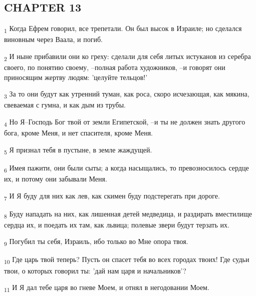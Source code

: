 \subsection{CHAPTER 13}
\begin{tcolorbox}
\textsubscript{1} Когда Ефрем говорил, все трепетали. Он был высок в Израиле; но сделался виновным через Ваала, и погиб.
\end{tcolorbox}
\begin{tcolorbox}
\textsubscript{2} И ныне прибавили они ко греху: сделали для себя литых истуканов из серебра своего, по понятию своему, --полная работа художников, --и говорят они приносящим жертву людям: 'целуйте тельцов!'
\end{tcolorbox}
\begin{tcolorbox}
\textsubscript{3} За то они будут как утренний туман, как роса, скоро исчезающая, как мякина, свеваемая с гумна, и как дым из трубы.
\end{tcolorbox}
\begin{tcolorbox}
\textsubscript{4} Но Я--Господь Бог твой от земли Египетской, --и ты не должен знать другого бога, кроме Меня, и нет спасителя, кроме Меня.
\end{tcolorbox}
\begin{tcolorbox}
\textsubscript{5} Я признал тебя в пустыне, в земле жаждущей.
\end{tcolorbox}
\begin{tcolorbox}
\textsubscript{6} Имея пажити, они были сыты; а когда насыщались, то превозносилось сердце их, и потому они забывали Меня.
\end{tcolorbox}
\begin{tcolorbox}
\textsubscript{7} И Я буду для них как лев, как скимен буду подстерегать при дороге.
\end{tcolorbox}
\begin{tcolorbox}
\textsubscript{8} Буду нападать на них, как лишенная детей медведица, и раздирать вместилище сердца их, и поедать их там, как львица; полевые звери будут терзать их.
\end{tcolorbox}
\begin{tcolorbox}
\textsubscript{9} Погубил ты себя, Израиль, ибо только во Мне опора твоя.
\end{tcolorbox}
\begin{tcolorbox}
\textsubscript{10} Где царь твой теперь? Пусть он спасет тебя во всех городах твоих! Где судьи твои, о которых говорил ты: 'дай нам царя и начальников'?
\end{tcolorbox}
\begin{tcolorbox}
\textsubscript{11} И Я дал тебе царя во гневе Моем, и отнял в негодовании Моем.
\end{tcolorbox}
